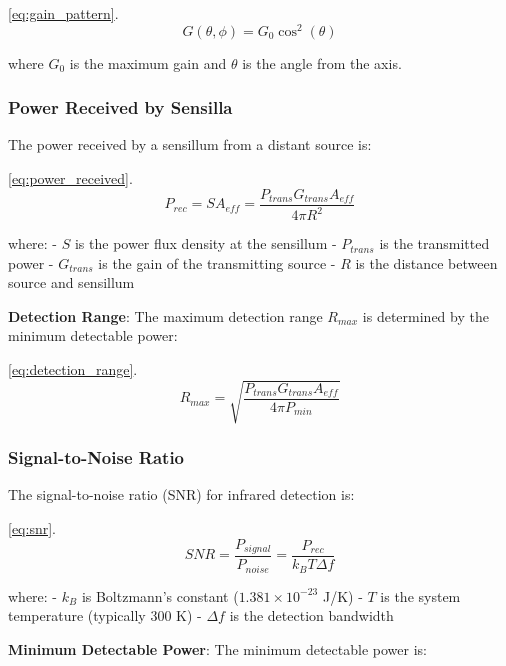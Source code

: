 \documentclass[
  13pt,
  a4paperpaper,
  12pt]{article}
\begin{document}
\eqref{eq:gain_pattern}. \begin{equation}
G(\theta, \phi) = G_0 \cos^2(\theta) \label{eq:gain_pattern}
\end{equation}

where \(G_0\) is the maximum gain and \(\theta\) is the angle from the
axis.

\subsubsection{Power Received by
Sensilla}\label{power-received-by-sensilla}

The power received by a sensillum from a distant source is:

\eqref{eq:power_received}. \begin{equation}
P_{rec} = S A_{eff} = \frac{P_{trans} G_{trans} A_{eff}}{4\pi R^2} \label{eq:power_received}
\end{equation}

where: - \(S\) is the power flux density at the sensillum -
\(P_{trans}\) is the transmitted power - \(G_{trans}\) is the gain of
the transmitting source - \(R\) is the distance between source and
sensillum

\textbf{Detection Range}: The maximum detection range \(R_{max}\) is
determined by the minimum detectable power:

\eqref{eq:detection_range}. \begin{equation}
R_{max} = \sqrt{\frac{P_{trans} G_{trans} A_{eff}}{4\pi P_{min}}} \label{eq:detection_range}
\end{equation}

\subsubsection{Signal-to-Noise Ratio}\label{signal-to-noise-ratio}

The signal-to-noise ratio (SNR) for infrared detection is:

\eqref{eq:snr}. \begin{equation}
SNR = \frac{P_{signal}}{P_{noise}} = \frac{P_{rec}}{k_B T \Delta f} \label{eq:snr}
\end{equation}

where: - \(k_B\) is Boltzmann's constant (\(1.381 \times 10^{-23}\) J/K)
- \(T\) is the system temperature (typically 300 K) - \(\Delta f\) is
the detection bandwidth

\textbf{Minimum Detectable Power}: The minimum detectable power is:
\end{document}
